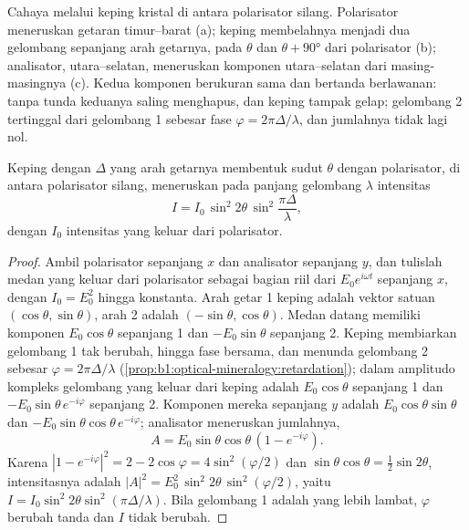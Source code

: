 \begin{omfigure}
{\small Cahaya melalui keping kristal di antara polarisator silang. Polarisator meneruskan getaran timur--barat (a); keping membelahnya menjadi dua gelombang sepanjang arah getarnya, pada $\theta$ dan $\theta + \ang{90}$ dari polarisator (b); analisator, utara--selatan, meneruskan komponen utara--selatan dari masing-masingnya (c). Kedua komponen berukuran sama dan bertanda berlawanan: tanpa tunda keduanya saling menghapus, dan keping tampak gelap; gelombang 2 tertinggal dari gelombang 1 sebesar fase $\varphi = 2\pi\Delta/\lambda$, dan jumlahnya tidak lagi nol.}
\end{omfigure}

\begin{theorem}\label{thm:b1:optical-mineralogy:intensity}
Keping dengan  $\Delta$ yang arah getarnya membentuk sudut
$\theta$ dengan polarisator, di antara polarisator silang, meneruskan pada panjang gelombang $\lambda$ intensitas
\[
  I = I_0\,\sin^2 2\theta\,\sin^2\frac{\pi\Delta}{\lambda},
\]
dengan $I_0$ intensitas yang keluar dari polarisator.
\end{theorem}

\begin{proof}
Ambil polarisator sepanjang $x$ dan analisator sepanjang $y$, dan tulislah medan yang keluar dari polarisator sebagai bagian riil dari $E_0 e^{i\omega t}$ sepanjang $x$, dengan $I_0 = E_0^2$ hingga konstanta. Arah getar 1 keping adalah vektor satuan $(\cos\theta, \sin\theta)$, arah 2 adalah $(-\sin\theta, \cos\theta)$.
Medan datang memiliki komponen $E_0\cos\theta$ sepanjang 1 dan
$-E_0\sin\theta$ sepanjang 2. Keping membiarkan gelombang 1 tak berubah, hingga fase bersama, dan menunda gelombang 2 sebesar $\varphi = 2\pi\Delta/\lambda$
(\cref{prop:b1:optical-mineralogy:retardation}); dalam amplitudo kompleks gelombang yang keluar dari keping adalah $E_0\cos\theta$ sepanjang 1 dan
$-E_0\sin\theta\,e^{-i\varphi}$ sepanjang 2. Komponen mereka sepanjang $y$ adalah $E_0\cos\theta\sin\theta$ dan $-E_0\sin\theta\cos\theta\,e^{-i\varphi}$; analisator meneruskan jumlahnya,
\[
  A = E_0\sin\theta\cos\theta\,(1 - e^{-i\varphi}) .
\]
Karena $|1 - e^{-i\varphi}|^2 = 2 - 2\cos\varphi = 4\sin^2(\varphi/2)$ dan $\sin\theta\cos\theta = \frac12\sin2\theta$, intensitasnya adalah $|A|^2 = E_0^2\,\sin^2 2\theta\,\sin^2(\varphi/2)$, yaitu $I = I_0\sin^2 2\theta\sin^2(\pi\Delta/\lambda)$. Bila gelombang 1 adalah yang lebih lambat, $\varphi$ berubah tanda dan $I$ tidak berubah.
\end{proof}

